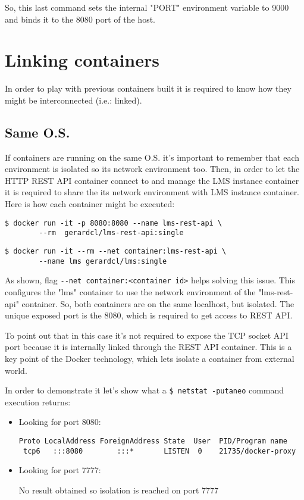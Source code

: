 So, this last command sets the internal "PORT" environment variable to 9000 and binds it to the 8080 port of the host.

\section{Linking containers}

In order to play with previous containers built it is required to know how they might be interconnected (i.e.: linked).

\subsection{Same O.S.}

If containers are running on the same O.S. it's important to remember that each environment is isolated so its network environment too. Then, in order to let the HTTP REST API container connect to and manage the LMS instance container it is required to share the its network environment with LMS instance container. Here is how each container might be executed:

\begin{verbatim}
$ docker run -it -p 8080:8080 --name lms-rest-api \
		--rm  gerardcl/lms-rest-api:single
\end{verbatim}
\begin{verbatim}
$ docker run -it --rm --net container:lms-rest-api \
		--name lms gerardcl/lms:single
\end{verbatim}

As shown, flag \verb|--net container:<container id>| helps solving this issue. This configures the "lms" container to use the network environment of the "lms-rest-api" container. So, both containers are on the same localhost, but isolated. The unique exposed port is the 8080, which is required to get access to REST API.

To point out that in this case it's not required to expose the TCP socket API port because it is internally linked through the REST API container. This is a key point of the Docker technology, which lets isolate a container from external world. 

In order to demonstrate it let's show what a \verb|$ netstat -putaneo| command  execution returns:
\begin{itemize}
\item Looking for port 8080: \hfill

\begin{verbatim}
Proto LocalAddress ForeignAddress State  User  PID/Program name 
 tcp6   :::8080        :::*       LISTEN  0    21735/docker-proxy
\end{verbatim}
\item Looking for port 7777: \hfill

No result obtained so isolation is reached on port 7777
\end{itemize}

